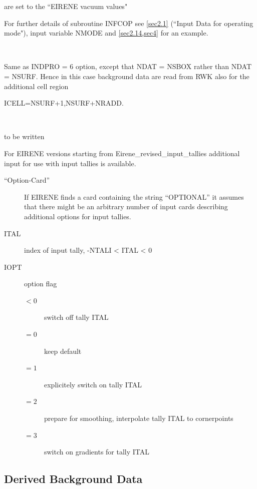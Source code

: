 \begin{description}
\begin{description}
                are set to the ``EIRENE vacuum values" 

                For further details of subroutine INFCOP see \cref{sec2.1} (``Input Data for
                operating mode"), input variable NMODE and \cref{sec2.14,sec4} for an example.

          \item[INDPRO = 7] ~ 

                Same as INDPRO = 6 option, except that NDAT = NSBOX rather than NDAT = NSURF.
                Hence in this case background data are read from RWK also for the additional
                cell region 

                ICELL=NSURF+1,NSURF+NRADD.

          \item[INDPRO = 8] ~ 

                to be written 

        \end{description}
\end{description}

For EIRENE versions starting from Eirene\_revised\_input\_tallies additional
input for use with input tallies is available.

\begin{description}
  \item[``Option-Card''] If EIRENE finds a card containing the string ``OPTIONAL''
        it assumes that there might be an arbitrary number of input cards 
        describing additional options for input tallies.
  \item[ITAL] index of input tally, -NTALI < ITAL < 0
  \item[IOPT] option flag
        \begin{description}
          \item[$< 0$] switch off tally ITAL
          \item[$= 0$] keep default
          \item[$= 1$] explicitely switch on tally ITAL
          \item[$= 2$] prepare for smoothing, interpolate tally ITAL to cornerpoints
          \item[$= 3$] switch on gradients for tally ITAL
        \end{description}
\end{description}

\subsection{Derived Background Data} \label{sec2.5.1} 

